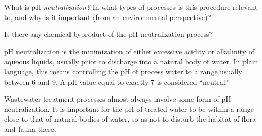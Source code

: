 

What is pH {\it neutralization?}  In what types of processes is this procedure relevant to, and why is it important (from an environmental perspective)?

\vskip 10pt

Is there any chemical byproduct of the pH neutralization process?







pH neutralization is the minimization of either excessive acidity or alkalinity of aqueous liquids, usually prior to discharge into a natural body of water.  In plain language, this means controlling the pH of process water to a range usually between 6 and 9.  A pH value equal to exactly 7 is considered ``neutral.''

Wastewater treatment processes almost always involve some form of pH neutralization.  It is important for the pH of treated water to be within a range close to that of natural bodies of water, so as not to disturb the habitat of flora and fauna there.












